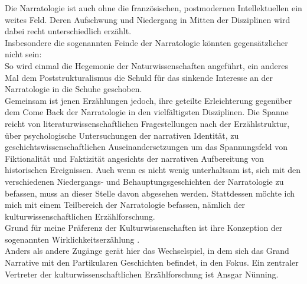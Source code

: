 Die Narratologie ist auch ohne die französischen, postmodernen Intellektuellen
ein weites Feld. Deren Aufschwung und Niedergang in Mitten der Disziplinen wird
dabei recht unterschiedlich erzählt. \\
Insbesondere die sogenannten Feinde der
Narratologie könnten gegensätzlicher nicht sein: \\
So wird einmal die Hegemonie
der Naturwissenschaften\footnotemark {} angeführt, ein anderes Mal dem Poststrukturalismus die
Schuld für das sinkende Interesse an der Narratologie in die Schuhe
geschoben\footnotemark {}. \\
Gemeinsam ist jenen Erzählungen jedoch, ihre geteilte Erleichterung
gegenüber dem Come Back der Narratologie in den vielfältigsten Disziplinen. Die
Spanne reicht von literaturwissenschaftlichen Fragestellungen nach der
Erzählstruktur, über psychologische Untersuchungen der narrativen Identität, zu
geschichtswissenschaftlichen Auseinandersetzungen um das Spannungsfeld von
Fiktionalität und Faktizität angesichts der narrativen Aufbereitung von
historischen Ereignissen. Auch wenn es nicht wenig unterhaltsam ist, sich mit
den verschiedenen Niedergangs- und Behauptungsgeschichten der Narratologie zu
befassen, muss an dieser Stelle davon abgesehen werden. Stattdessen möchte ich
mich mit einem Teilbereich der Narratologie befassen, nämlich der
kulturwissenschaftlichen Erzählforschung. \\
Grund für meine Präferenz der
Kulturwissenschaften ist ihre Konzeption der sogenannten
\glqq Wirklichkeitserzählung \grqq\footnotemark {}. \\
Anders als andere Zugänge gerät hier das
Wechselspiel, in dem sich das Grand Narrative mit den Partikularen Geschichten
befindet, in den Fokus. Ein zentraler Vertreter der kulturwissenschaftlichen 
Erzählforschung ist Ansgar Nünning.

